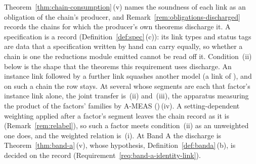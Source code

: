
Theorem~\ref{thm:chain-consumption}\,(v) names the soundness of each link as
an obligation of the chain's producer, and Remark~\ref{rem:obligations-discharged}
records the chains for which the producer's own theorems discharge it. A
specification is a record (Definition~\ref{def:spec}\,(c)): its link types
and status tags are data that a specification written by hand can carry
equally, so whether a chain is one the reductions module emitted cannot be
read off it. Condition~(ii) below is the shape that the theorems this
requirement uses discharge. An instance link followed by a further link
squashes another model (a link of ),
and on such a chain the row stays. At several
 whose segments are each that
factor's instance link alone, the joint transfer is
\,(ii) and~(iii), the apparatus
measuring the product of the factors' families by A-MEAS
()\,(iv). A setting-dependent weighting applied
after a factor's segment leaves the chain record as it is
(Remark~\ref{rem:relabel}), so such a factor meets condition~(ii) as an
unweighted one does, and the weighted relation is
\,(i). At Band A the discharge is
Theorem~\ref{thm:band-a}\,(v), whose hypothesis, Definition~\ref{def:banda}\,(b),
is decided on the record (Requirement~\ref{req:band-a-identity-link}).

